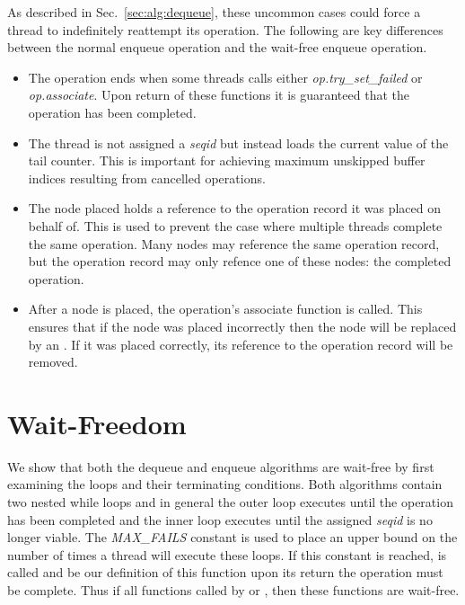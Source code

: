 As described in Sec.~\ref{sec:alg:dequeue}, these uncommon cases could force a thread to indefinitely reattempt its operation.
The following are key differences between the normal enqueue operation and the wait-free enqueue operation.
\begin{itemize}
\item The operation ends when some threads calls either \emph{op.try\_set\_failed} or \emph{op.associate}. %
Upon return of these functions it is guaranteed that the operation has been completed.
\item The thread is not assigned a \emph{seqid} but instead loads the current value of the tail counter.
This is important for achieving maximum unskipped buffer indices resulting from cancelled operations.
\item The node placed holds a reference to the operation record it was placed on behalf of.
This is used to prevent the case where multiple threads complete the same operation.
Many nodes may reference the same operation record, but the operation record may only refence one of these nodes: the completed operation.
\item After a node is placed, the operation's associate function is called.
This ensures that if the node was placed incorrectly then the node will be replaced by an .
If it was placed correctly, its reference to the operation record will be removed.

\end{itemize}

\section{Wait-Freedom}
We show that both the dequeue and enqueue algorithms are wait-free by first examining the loops and their terminating conditions. Both algorithms contain two nested while loops and in general the outer loop executes until the operation has been completed and the inner loop executes until the assigned \emph{seqid} is no longer viable.
The \emph{MAX\_FAILS} constant is used to place an upper bound on the number of times a thread will execute these loops.
If this constant is reached,  is called and be our definition of this function upon its return the operation must be complete. Thus if all functions called by  or , then these functions are wait-free.


